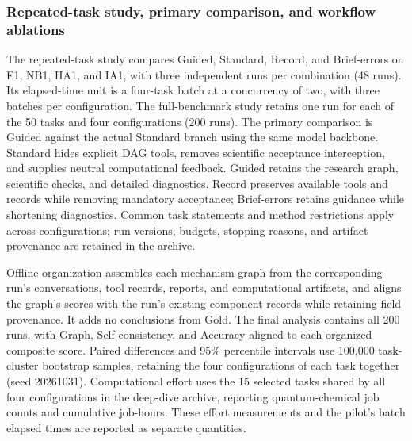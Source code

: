 \subsubsection{Repeated-task study, primary comparison, and workflow ablations}

The repeated-task study compares Guided, Standard, Record, and Brief-errors on E1, NB1, HA1, and IA1, with three independent runs per combination (48 runs). Its elapsed-time unit is a four-task batch at a concurrency of two, with three batches per configuration. The full-benchmark study retains one run for each of the 50 tasks and four configurations (200 runs). The primary comparison is Guided against the actual Standard branch using the same model backbone. Standard hides explicit DAG tools, removes scientific acceptance interception, and supplies neutral computational feedback. Guided retains the research graph, scientific checks, and detailed diagnostics. Record preserves available tools and records while removing mandatory acceptance; Brief-errors retains guidance while shortening diagnostics. Common task statements and method restrictions apply across configurations; run versions, budgets, stopping reasons, and artifact provenance are retained in the archive.

Offline organization assembles each mechanism graph from the corresponding run's conversations, tool records, reports, and computational artifacts, and aligns the graph's scores with the run's existing component records while retaining field provenance. It adds no conclusions from Gold. The final analysis contains all 200 runs, with Graph, Self-consistency, and Accuracy aligned to each organized composite score. Paired differences and 95\% percentile intervals use 100,000 task-cluster bootstrap samples, retaining the four configurations of each task together (seed 20261031). Computational effort uses the 15 selected tasks shared by all four configurations in the deep-dive archive, reporting quantum-chemical job counts and cumulative job-hours. These effort measurements and the pilot's batch elapsed times are reported as separate quantities.
